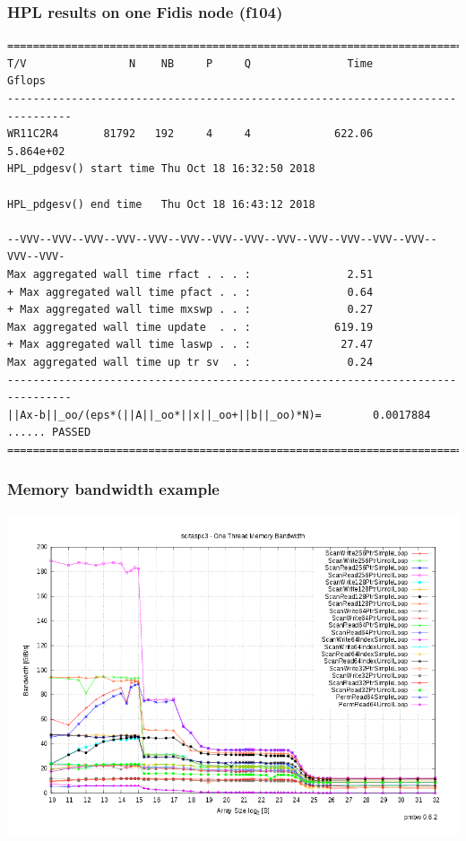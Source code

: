 \begin{frame}[containsverbatim]
\frametitle{HPL results on one Fidis node (f104)}
\tiny
\begin{verbatim}
================================================================================
T/V                N    NB     P     Q               Time                 Gflops
--------------------------------------------------------------------------------
WR11C2R4       81792   192     4     4             622.06              5.864e+02
HPL_pdgesv() start time Thu Oct 18 16:32:50 2018

HPL_pdgesv() end time   Thu Oct 18 16:43:12 2018

--VVV--VVV--VVV--VVV--VVV--VVV--VVV--VVV--VVV--VVV--VVV--VVV--VVV--VVV--VVV-
Max aggregated wall time rfact . . . :               2.51
+ Max aggregated wall time pfact . . :               0.64
+ Max aggregated wall time mxswp . . :               0.27
Max aggregated wall time update  . . :             619.19
+ Max aggregated wall time laswp . . :              27.47
Max aggregated wall time up tr sv  . :               0.24
--------------------------------------------------------------------------------
||Ax-b||_oo/(eps*(||A||_oo*||x||_oo+||b||_oo)*N)=        0.0017884 ...... PASSED
================================================================================
\end{verbatim}
\end{frame}



\begin{frame}[containsverbatim]
\frametitle{Memory bandwidth example}

\begin{center}
\includegraphics[page=61,width=.9\textwidth]{Day0/images/plots-scitaspc3-p1.png}
\end{center}

\end{frame}

